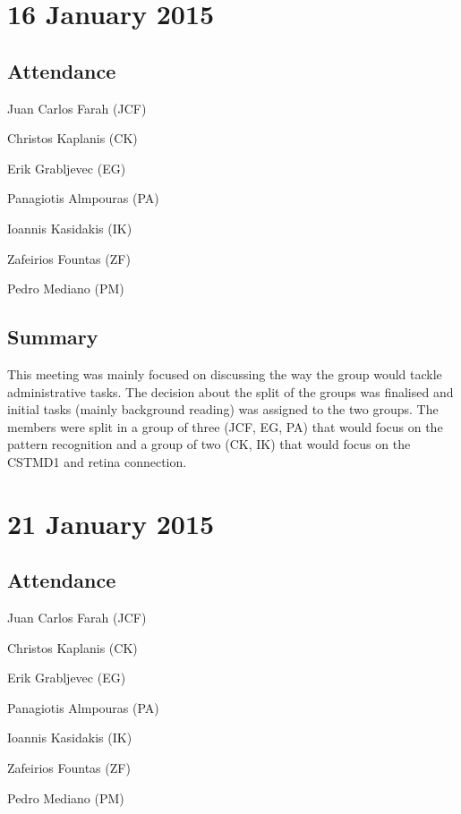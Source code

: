 \documentclass[a4paper,11pt]{article}
\begin{document}
\begin{appendices}
\section*{16 January 2015}
\subsection*{Attendance}
\begin{compactenum}
\item Juan Carlos Farah (JCF)
\item Christos Kaplanis (CK)
\item Erik Grabljevec (EG)
\item Panagiotis Almpouras (PA)
\item Ioannis Kasidakis (IK)
\item Zafeirios Fountas (ZF)
\item Pedro Mediano (PM)
\end{compactenum}

\subsection*{Summary}
This meeting was mainly focused on discussing the way the group would tackle administrative tasks. The decision about the split of the groups was finalised and initial tasks (mainly background reading) was assigned to the two groups. The members were split in a group of three (JCF, EG, PA) that would focus on the pattern recognition and a group of two (CK, IK) that would focus on the CSTMD1 and retina connection.

\maketitle
\section*{21 January 2015}
\subsection*{Attendance}
\begin{compactenum}
\item Juan Carlos Farah (JCF)
\item Christos Kaplanis (CK)
\item Erik Grabljevec (EG)
\item Panagiotis Almpouras (PA)
\item Ioannis Kasidakis (IK)
\item Zafeirios Fountas (ZF)
\item Pedro Mediano (PM)
\end{compactenum}


\end{appendices}
\end{document}
